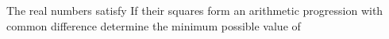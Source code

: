 The real numbers    satisfy   If their squares form an arithmetic progression with common difference  determine the minimum possible value of 